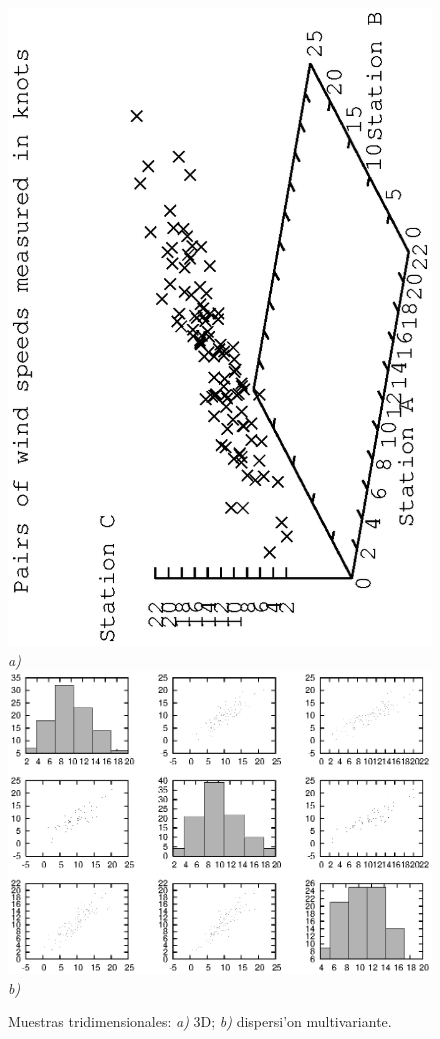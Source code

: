 \documentclass[spanish,12pt,a4paper]{article}
\begin{document}
\begin{description}
\begin{figure}
\begin{center}
\includegraphics[scale=1.0,angle=270]{dataplot5.eps} \\
\emph{a)} \\ 
\includegraphics[scale=1.0]{dataplot6.eps} \\
\emph{b)} \\
\caption{Muestras tridimensionales: \emph{a)} 3D; \emph{b)} dispersi'on multivariante.}
\label{fig3}
\end{center}
\end{figure}


\end{description}
\end{document}
